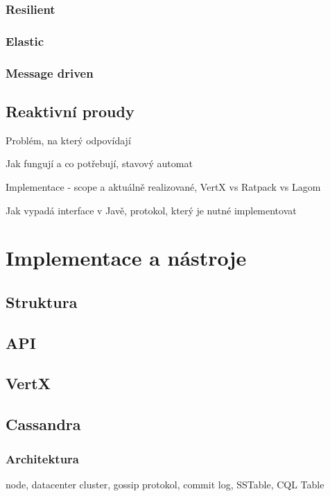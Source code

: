 \documentclass[FM,DP]{tulthesis}
\begin{document}
\subsection{Resilient}

\subsection{Elastic}

\subsection{Message driven}

\section{Reaktivní proudy}
Problém, na který odpovídají

Jak fungují a co potřebují, stavový automat

Implementace - scope a aktuálně realizované, VertX vs Ratpack vs Lagom

Jak vypadá interface v Javě, protokol, který je nutné implementovat

\chapter{Implementace a nástroje}

\section{Struktura}

\section{API}

\section{VertX}

\section{Cassandra}

\subsection{Architektura}

node, datacenter cluster, gossip protokol, commit  log, SSTable, CQL Table
\end{document}

